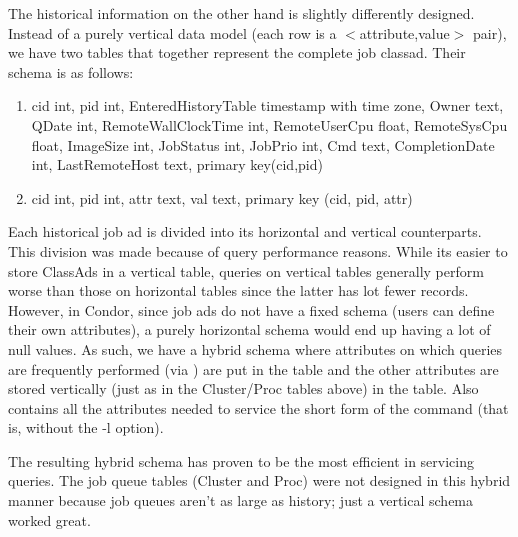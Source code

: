 The historical information on the other hand is slightly differently
designed.  Instead of a purely vertical data model (each row is a
$<$attribute,value$>$ pair), we have two tables that together represent the
complete job classad.  Their schema is as follows:

\begin{enumerate}

\item {}
        {cid                  int,
        pid                  int,
	EnteredHistoryTable  timestamp with time zone,
        Owner                text,
        QDate                int,
        RemoteWallClockTime  int,
        RemoteUserCpu        float,
        RemoteSysCpu         float,
        ImageSize            int,
        JobStatus            int,
        JobPrio              int,
        Cmd                  text,
        CompletionDate       int,
        LastRemoteHost       text,
        primary key(cid,pid)}

\item {}
	{cid int, pid int, attr text, val text, primary key
	(cid, pid, attr)}

\end{enumerate}

Each historical job ad is divided into its horizontal and vertical
counterparts.  This division was made because of query performance
reasons.  While its easier to store ClassAds in a vertical table,
queries on vertical tables generally perform worse than those on
horizontal tables since the latter has lot fewer records.  However, in
Condor, since job ads do not have a fixed schema (users can define their
own attributes), a purely horizontal schema would end up having a lot
of null values. As such, we have a hybrid schema where attributes on
which queries are frequently performed (via ) are put
in the  table and the other attributes
are stored vertically (just as in the Cluster/Proc tables above) in the
 table. Also 
contains all the attributes needed to service the short form of the
 command (that is, without the -l option).

The resulting hybrid schema has proven to be the most efficient in
servicing  queries.  The job queue tables (Cluster and
Proc) were not designed in this hybrid manner because job queues aren't
as large as history; just a vertical schema worked great.


